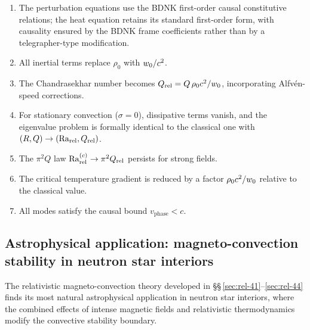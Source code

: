 \begin{enumerate}
  \item The perturbation equations use the BDNK first-order causal
    constitutive relations; the heat equation retains its standard
    first-order form, with causality ensured by the BDNK frame
    coefficients rather than by a telegrapher-type modification.
  \item All inertial terms replace $\rho_{0}$ with
    $w_{0}/c^{2}$.
  \item The Chandrasekhar number becomes
    $Q_{\mathrm{rel}} = Q\,\rho_0 c^{2}/w_{0}$, incorporating
    Alfv\'en-speed corrections.
  \item For stationary convection ($\sigma=0$), dissipative terms
    vanish, and the eigenvalue problem is formally identical to the
    classical one with $(R,Q)\to(\mathrm{Ra}_{\mathrm{rel}},Q_{\mathrm{rel}})$.
  \item The $\pi^{2}Q$ law $\mathrm{Ra}_{\mathrm{rel}}^{(c)}\to\pi^{2}Q_{\mathrm{rel}}$
    persists for strong fields.
  \item The critical temperature gradient is reduced by a factor
    $\rho_0 c^{2}/w_{0}$ relative to the classical
    value.
  \item All modes satisfy the causal bound
    $v_{\text{phase}}<c$.
\end{enumerate}

\subsection*{Astrophysical application: magneto-convection stability
  in neutron star interiors}

The relativistic magneto-convection theory developed in
\S\S\,\ref{sec:rel-41}--\ref{sec:rel-44} finds its most natural
astrophysical application in neutron star interiors, where the combined
effects of intense magnetic fields and relativistic thermodynamics
modify the convective stability boundary.

